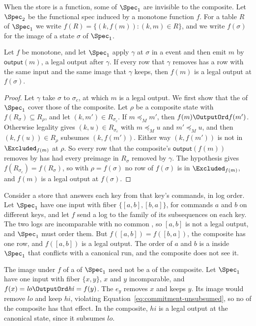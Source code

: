 When the store is a function, some \commitments of $\Spec_1$ are invisible to
the composite.  Let $\Spec_2$ be the functional spec induced by a monotone
function $f$.  For a table $R$ of $\Spec_1$ we write
$f(R)=\{(k,f(m)):(k,m)\in R\}$, and we write $f(\sigma)$ for the image of a
state $\sigma$ of $\Spec_1$.

\begin{proposition}
\label{prop:invisible-coordination}
Let $f$ be monotone, and let $\Spec_1$ apply $\gamma$ at $\sigma$ in a
\commitment event and then emit $m$ by $\mathsf{output}(m)$, a legal output
after $\gamma$.  If every row that $\gamma$ removes has a row with the same
input and the same image that $\gamma$ keeps, then $f(m)$ is a legal output at
$f(\sigma)$.
\end{proposition}

\begin{proof}
Let $\gamma$ take $\sigma$ to $\sigma_c$, at which $m$ is a legal output.  We
first show that the \commitments of $\Spec_1$ cover those of the composite.
Let $\rho$ be a composite state with $f(R_\sigma)\subseteq R_\rho$, and let
$(k,m')\in R_{\sigma_c}$.  If $m\preceq_M m'$, then $f(m)\OutputOrd f(m')$.
Otherwise legality gives $(k,u)\in R_{\sigma_c}$ with $m\preceq_M u$ and
$m'\preceq_M u$, and then $(k,f(u))\in R_\rho$ subsumes $(k,f(m'))$.  Either
way $(k,f(m'))$ is not in $\Excluded_{f(m)}$ at $\rho$.  So every row that the
composite's $\mathsf{output}(f(m))$ removes by \commitment has had every
preimage in $R_\sigma$ removed by $\gamma$.  The hypothesis gives
$f(R_{\sigma_c})=f(R_\sigma)$, so with $\rho=f(\sigma)$ no row of $f(\sigma)$
is in $\Excluded_{f(m)}$, and $f(m)$ is a legal output at $f(\sigma)$.
\end{proof}

Consider a store that answers each key from that key's commands, in log
order.  Let $\Spec_1$ have one input with fiber $\{[a,b],[b,a]\}$, for
commands $a$ and $b$ on different keys, and let $f$ send a log to the family
of its subsequences on each key.  The two logs are incomparable with no common
\outnoun, so $[a,b]$ is not a legal output, and $\Spec_1$ must order them.
But $f([a,b])=f([b,a])$, the composite has one row, and $f([a,b])$ is a legal
output.  The order of $a$ and $b$ is a \commitment inside $\Spec_1$ that
conflicts with a canonical run, and the composite does not see it.

The image under $f$ of a \commitment of $\Spec_1$ need not be a \commitment
of the composite.  Let $\Spec_1$ have one input with fiber $\{x,y\}$, $x$ and
$y$ incomparable, and $f(x)=\mathit{lo}\OutputOrd\mathit{hi}=f(y)$.  The
\commitment $e_y$ removes $x$ and keeps $y$.  Its image would remove
$\mathit{lo}$ and keep $\mathit{hi}$, violating
Equation~\ref{eq:commitment-unsubsumed}, so no \commitment of the composite
has that effect.  In the composite, $\mathit{hi}$ is a legal output at the
canonical state, since it subsumes $\mathit{lo}$.


